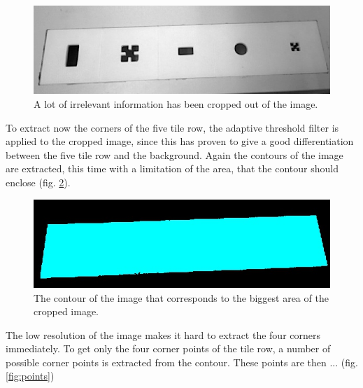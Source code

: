 \documentclass{article}
\begin{document}
\begin{figure}[h!]
\centering
\includegraphics[scale=0.3]{images/cropped.jpg}
\caption{A lot of irrelevant information has been cropped out of the image.}
\label{fig:cropped}
\end{figure}
To extract now the corners of the five tile row, the adaptive threshold filter is applied to the cropped image, since this has proven to give a good differentiation between the five tile row and the background. Again the contours of the image are extracted, this time with a limitation of the area, that the contour should enclose (fig. \ref{fig:five}). \\
\begin{figure}[h!]
\centering
\includegraphics[scale=0.3]{images/5tiles.jpg}
\caption{The contour of the image that corresponds to the biggest area of the cropped image.}
\label{fig:five}
\end{figure}
The low resolution of the image makes it hard to extract the four corners immediately. To get only the four corner points of the tile row, a number of possible corner points is extracted from the contour. These points are then ... (fig. \ref{fig:points})\\
\end{document}
